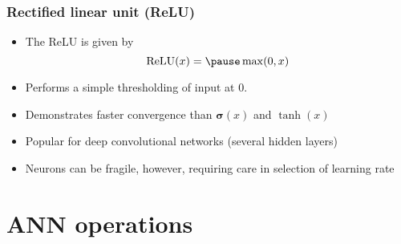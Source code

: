 \documentclass[smaller]{beamer}
\begin{document}
\begin{frame}
  \frametitle{Rectified linear unit (ReLU)}
  \pause

  \begin{itemize}[<+->]
  \item The ReLU is given by
    \begin{equation}
      \text{ReLU}(x) = \pause \max(0,x)
    \end{equation}

  \item Performs a simple thresholding of input at 0.


    \begin{figure}[t!]\centering
    \end{figure}

  \item Demonstrates faster convergence than $\bm\sigma(x)$ and $\tanh(x)$
  \item Popular for deep convolutional networks (several hidden layers)
  \item Neurons can be fragile, however, requiring care in selection of learning rate
  \end{itemize}
  
\end{frame}


 


\section{ANN operations}
\end{document}
